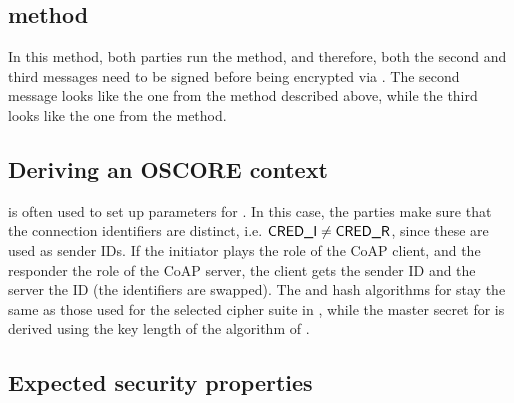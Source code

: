 \subsection{\mSigSig method}
In this method, both parties run the \mSig method, and therefore, both the second and third messages need to be signed before being encrypted via \mAead. The second message looks like the one from the \mSigStat method described above, while the third looks like the one from the \mStatSig method.



\subsection{Deriving an OSCORE context}
\mEdhoc is often used to set up parameters for \mOscore. In this case, the parties make sure that the connection identifiers are distinct, i.e. $\text{\textup{\textsf{CRED\_I}}} \neq \text{\textup{\textsf{CRED\_R}}}$, since these are used as \mOscore sender IDs. If the initiator plays the role of the CoAP client, and the responder the role of the CoAP server, the client gets the sender ID \mCredr and the server the ID \mCredi (the identifiers are swapped). The \mAead and hash algorithms for \mOscore stay the same as those used for the selected cipher suite in \mEdhoc, while the master secret for \mOscore is derived using the key length of the \mAead algorithm of \mEdhoc. 

\subsection{Expected security properties}

